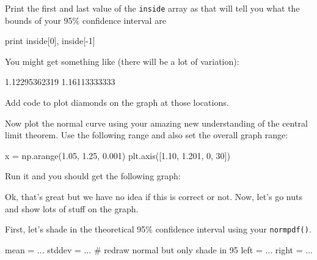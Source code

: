 \begin{fullwidth}
\step Print the first and last value of the {\tt inside} array as that will tell you what the bounds of your 95\% confidence interval are

\begin{pyverbatim}
print inside[0], inside[-1]
\end{pyverbatim}

\noindent You might get something like (there will be a lot of variation):

1.12295362319 1.16113333333

\step Add code to plot diamonds on the graph at those locations.

\step Now plot the normal curve using your amazing new understanding of the central limit  theorem. Use the following range and also set the overall graph range:

\begin{pyverbatim}
x = np.arange(1.05, 1.25, 0.001)
plt.axis([1.10, 1.201, 0, 30])
\end{pyverbatim}

\step Run it and you should get the following graph:


Ok, that's great but we have no idea if this is correct or not. Now, let's go nuts and show lots of stuff on the graph.

\step First, let's shade in the theoretical 95\% confidence interval using your {\tt normpdf()}.

\begin{pyverbatim}
mean = ...
stddev = ...
# redraw normal but only shade in 95%
left  = ...
right = ...


\end{pyverbatim}
\end{fullwidth}
